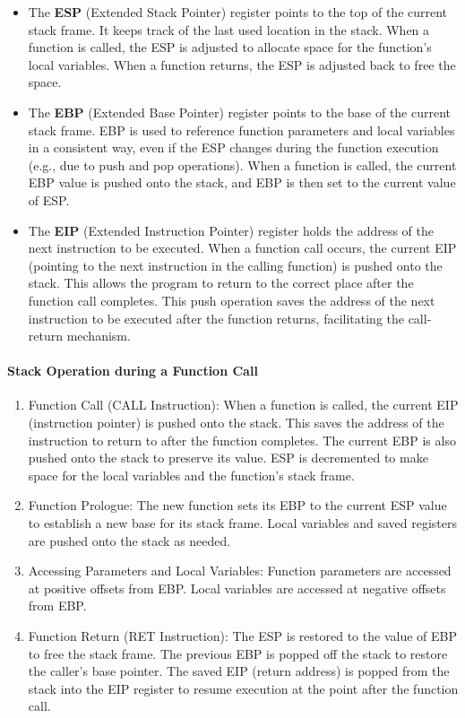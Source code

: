 \begin{itemize}
    \item The \textbf{ESP} (Extended Stack Pointer) register points to the top of the current stack frame. It keeps track of the last used location in the stack. When a function is called, the ESP is adjusted to allocate space for the function's local variables. When a function returns, the ESP is adjusted back to free the space.
    \item The \textbf{EBP} (Extended Base Pointer) register points to the base of the current stack frame. EBP is used to reference function parameters and local variables in a consistent way, even if the ESP changes during the function execution (e.g., due to push and pop operations). When a function is called, the current EBP value is pushed onto the stack, and EBP is then set to the current value of ESP.
    \item The \textbf{EIP} (Extended Instruction Pointer) register holds the address of the next instruction to be executed. When a function call occurs, the current EIP (pointing to the next instruction in the calling function) is pushed onto the stack. This allows the program to return to the correct place after the function call completes. This push operation saves the address of the next instruction to be executed after the function returns, facilitating the call-return mechanism.
\end{itemize}

\paragraph{Stack Operation during a Function Call}
\begin{enumerate}
    \item Function Call (CALL Instruction): When a function is called, the current EIP (instruction pointer) is pushed onto the stack. This saves the address of the instruction to return to after the function completes. The current EBP is also pushed onto the stack to preserve its value. ESP is decremented to make space for the local variables and the function's stack frame.
    \item Function Prologue: The new function sets its EBP to the current ESP value to establish a new base for its stack frame. Local variables and saved registers are pushed onto the stack as needed.
    \item Accessing Parameters and Local Variables: Function parameters are accessed at positive offsets from EBP. Local variables are accessed at negative offsets from EBP.
    \item Function Return (RET Instruction): The ESP is restored to the value of EBP to free the stack frame. The previous EBP is popped off the stack to restore the caller's base pointer. The saved EIP (return address) is popped from the stack into the EIP register to resume execution at the point after the function call.
\end{enumerate}

